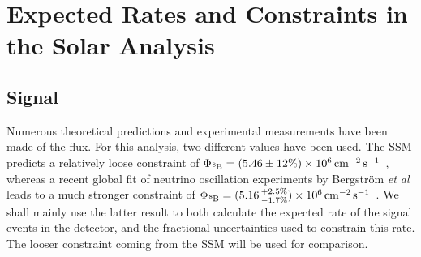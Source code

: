 \chapter{Expected Rates and Constraints in the Solar Analysis}\label{chap:appendix_solar_rates}

\section[Boron-8 Signal]{\beight{} Signal}
Numerous theoretical predictions and experimental measurements have been made of the \beight{} flux. For this analysis, two different values have been used. The SSM predicts a relatively loose constraint of $\Phi_{\beight{}} = (5.46\pm 12\%)\times 10^{6}\,\si{\per\cm\squared\per\second}$~\cite{vinyolesB16StandardSolar2018}, %
whereas a recent global fit of neutrino oscillation experiments by Bergstr\"{o}m \textit{et al} leads to a much stronger constraint of $\Phi_{\beight{}} = (5.16\,^{+2.5\%}_{-1.7\%})\times 10^{6}\,\si{\per\cm\squared\per\second}$~\cite{bergstromUpdatedDeterminationSolar2016}. %
We shall mainly use the latter result to both calculate the expected rate of the signal events in the detector, and the fractional uncertainties used to constrain this rate. The looser constraint coming from the SSM will be used for comparison.

